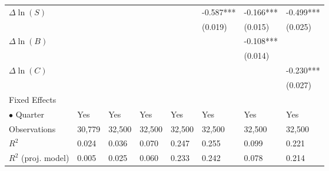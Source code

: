 \documentclass[openany]{book}
\theoremstyle{definition}
\theoremstyle{definition}
\theoremstyle{definition}
\theoremstyle{remark}
\begin{document}
\begin{table}[ht]
\begin{tabularx}{0.975\textwidth}{lYYYYYYY}
  $\Delta\ln(S)$ &  &  &  &  & -0.587*** & -0.166*** & -0.499*** \\ 
   &  &  &  &  & (0.019) & (0.015) & (0.025) \\ 
  $\Delta\ln(B)$ &  &  &  &  &  & -0.108*** &  \\ 
   &  &  &  &  &  & (0.014) &  \\ 
  $\Delta\ln(C)$ &  &  &  &  &  &  & -0.230*** \\ 
   &  &  &  &  &  &  & (0.027) \\ 
  Fixed Effects &  &  &  &  &  &  &  \\ 
  $\bullet$ Quarter & Yes & Yes & Yes & Yes & Yes & Yes & Yes \\ 
  Observations & 30,779 & 32,500 & 32,500 & 32,500 & 32,500 & 32,500 & 32,500 \\ 
  $R^2$ & 0.024 & 0.036 & 0.070 & 0.247 & 0.255 & 0.099 & 0.221 \\ 
  $R^2$ (proj. model) & 0.005 & 0.025 & 0.060 & 0.233 & 0.242 & 0.078 & 0.214 \\ 
   \bottomrule
\end{tabularx}
\endgroup
\end{table}
\end{document}
